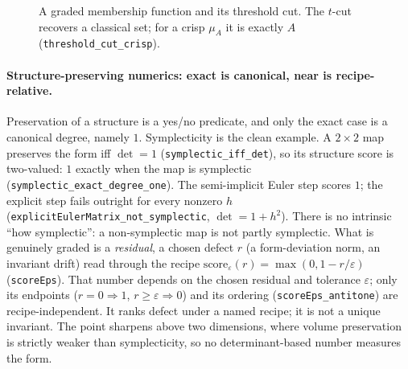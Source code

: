 \documentclass[11pt,a4paper]{article}
\newcommand{\Lean}[1]{\texttt{#1}}
\begin{document}
\begin{figure}[h]
\centering
{}
\caption{A graded membership function and its threshold cut.  The
$t$-cut recovers a classical set; for a crisp $\mu_A$ it is exactly $A$
(\Lean{threshold\_cut\_crisp}).}
\label{fig:fuzzy-cut}
\end{figure}

\paragraph{Structure-preserving numerics: exact is canonical, near is
recipe-relative.}
Preservation of a structure is a yes/no predicate, and only the exact
case is a canonical degree, namely $1$.  Symplecticity is the clean
example.  A $2\times2$ map preserves the form iff $\det=1$
(\Lean{symplectic\_iff\_det}), so its structure score is two-valued:
$1$ exactly when the map is symplectic
(\Lean{symplectic\_exact\_degree\_one}).  The semi-implicit Euler step
scores $1$; the explicit step fails outright for every nonzero $h$
(\Lean{explicitEulerMatrix\_not\_symplectic}, $\det=1+h^2$).  There is no
intrinsic ``how symplectic'': a non-symplectic map is not partly
symplectic.  What is genuinely graded is a \emph{residual}, a chosen
defect $r$ (a form-deviation norm, an invariant drift) read through the
recipe $\mathrm{score}_\varepsilon(r)=\max(0,1-r/\varepsilon)$
(\Lean{scoreEps}).  That number depends on the chosen residual and
tolerance $\varepsilon$; only its endpoints
($r=0\Rightarrow1$, $r\ge\varepsilon\Rightarrow0$) and its ordering
(\Lean{scoreEps\_antitone}) are recipe-independent.  It ranks defect
under a named recipe; it is not a unique invariant.  The point sharpens
above two dimensions, where volume preservation is strictly weaker than
symplecticity, so no determinant-based number measures the form.
\end{document}
